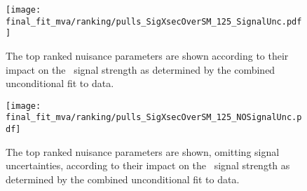 \begin{figure}[ht]
  \centering
  \texttt{[image: final\_fit\_mva/ranking/pulls\_SigXsecOverSM\_125\_SignalUnc.pdf]}
  \caption{The top ranked nuisance parameters are shown according to their impact
    on the \VHbb\ signal strength as determined by the combined unconditional
    fit to data.}
  \label{fig:Rank_012L_MVAVH}
\end{figure}
\begin{figure}[hb]
  \centering
  \texttt{[image: final\_fit\_mva/ranking/pulls\_SigXsecOverSM\_125\_NOSignalUnc.pdf]}
  \caption{The top ranked nuisance parameters are shown, omitting signal
    uncertainties, according to their impact on the \VHbb\ signal strength as
    determined by the combined unconditional fit to data.}
  \label{fig:Rank_012L_MVAVH_nosig}
\end{figure}
